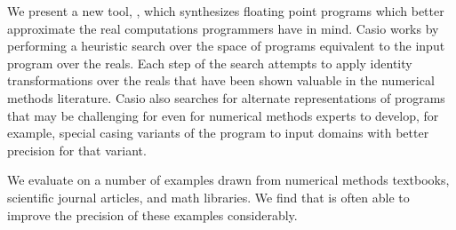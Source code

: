 \documentclass[paper.tex]{subfiles}
\begin{document}
We present a new tool, \casio, which synthesizes floating point programs
which better approximate the real computations programmers have in mind.
Casio works by performing a heuristic search over the space of programs
equivalent to the input program over the reals.  Each step of the search
attempts to apply identity transformations over the reals that have been
shown valuable in the numerical methods literature.  Casio also searches
for alternate representations of programs that may be challenging for even
for numerical methods experts to develop, for example, special casing
variants of the program to input domains with better precision for that
variant.

We evaluate \casio on a number of examples drawn from numerical methods
textbooks, scientific journal articles, and math libraries.  We find that
\casio is often able to improve the precision of these examples
considerably.
\end{document}
